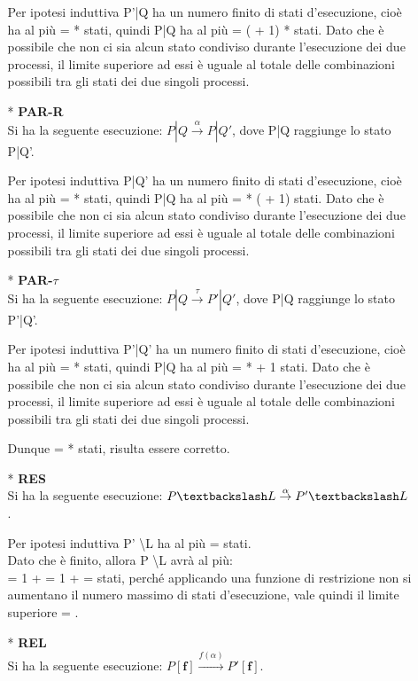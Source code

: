\begin{itemize}
\begin{itemize}
		Per ipotesi induttiva P'|Q ha un numero finito di stati d'esecuzione, cioè ha al più  =  *  stati, quindi P|Q ha al più  = ( + 1) *  stati. Dato che è possibile che non ci sia alcun stato condiviso durante l'esecuzione dei due processi, il limite superiore ad essi è uguale al totale delle combinazioni possibili tra gli stati dei due singoli processi.	
		\\
		\item[*] \textbf{PAR-R}
		\\
		Si ha la seguente esecuzione: $P|Q \overset{\alpha}\rightarrow P|Q'$, dove P|Q raggiunge lo stato P|Q'.
		
		Per ipotesi induttiva P|Q' ha un numero finito di stati d'esecuzione, cioè ha al più  =  *  stati, quindi P|Q ha al più  =  * ( + 1) stati. Dato che è possibile che non ci sia alcun stato condiviso durante l'esecuzione dei due processi, il limite superiore ad essi è uguale al totale delle combinazioni possibili tra gli stati dei due singoli processi.
		\\
		\item[*] \textbf{PAR-$\tau$}
		\\
		Si ha la seguente esecuzione: $P|Q \overset{\tau}\rightarrow P'|Q'$, dove P|Q raggiunge lo stato P'|Q'.
		
		Per ipotesi induttiva P'|Q' ha un numero finito di stati d'esecuzione, cioè ha al più  =  *  stati, quindi P|Q ha al più  =  *  + 1 stati. Dato che è possibile che non ci sia alcun stato condiviso durante l'esecuzione dei due processi, il limite superiore ad essi è uguale al totale delle combinazioni possibili tra gli stati dei due singoli processi.
		
		Dunque  =  *  stati, risulta essere corretto.
		\\
		\item[*] \textbf{RES}
		\\
		Si ha la seguente esecuzione: $P \textbackslash L \overset{\alpha}\rightarrow P' \textbackslash L$. 
		
		Per ipotesi induttiva  P' \textbackslash L ha al più  =  stati. \\
		Dato che  è finito, allora P \textbackslash L avrà al più: \\
		 = 1 +  = 1 +  =  stati, perché applicando una funzione di restrizione non si aumentano il numero massimo di stati d'esecuzione, vale quindi il limite superiore  = .
			\\
		\item[*] \textbf{REL}
		\\
		Si ha la seguente esecuzione: $P \mathbf{[f]} \overset{f(\alpha)}\rightarrow P'\mathbf{[f]}$. 
		

\end{itemize}
\end{itemize}
